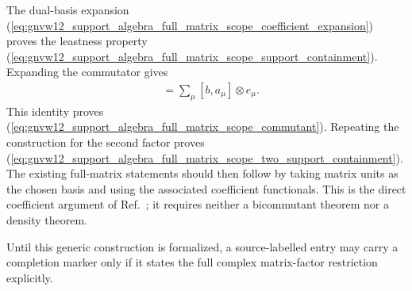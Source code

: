 \documentclass[11pt]{article}
\begin{document}
The dual-basis expansion
(\ref{eq:gnvw12_support_algebra_full_matrix_scope_coefficient_expansion})
proves the leastness property
(\ref{eq:gnvw12_support_algebra_full_matrix_scope_support_containment}).
Expanding the commutator gives
\begin{align}
    [b\otimes\mathbf{1},a]
    &=\sum_\mu[b,a_\mu]\otimes e_\mu.
    \label{eq:gnvw12_support_algebra_full_matrix_scope_commutator_expansion}
\end{align}
This identity proves
(\ref{eq:gnvw12_support_algebra_full_matrix_scope_commutant}). Repeating the
construction for the second factor proves
(\ref{eq:gnvw12_support_algebra_full_matrix_scope_two_support_containment}).
The existing full-matrix statements should then follow by taking matrix units
as the chosen basis and using the associated coefficient functionals. This is
the direct coefficient argument of Ref.~\cite{Gross2012IndexTheory}; it
requires neither a bicommutant theorem nor a density theorem.

Until this generic construction is formalized, a source-labelled entry may
carry a completion marker only if it states the full complex matrix-factor
restriction explicitly.



\end{document}
